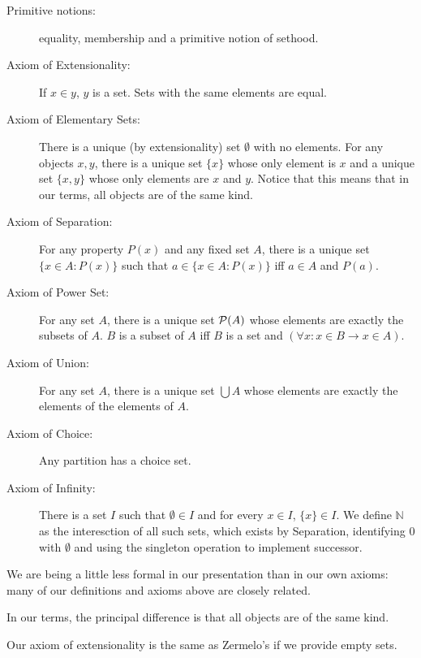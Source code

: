\documentclass[12pt]{article}
\begin{document}
\begin{description}

\item[Primitive notions:]  equality, membership and a primitive notion of sethood.  

\item[Axiom of Extensionality:]  If $x \in y$, $y$ is a set.  Sets with the same elements are equal.

\item[Axiom of Elementary Sets:]  There is a unique (by extensionality) set $\emptyset$ with no elements.  For any objects $x,y$, there is a unique set $\{x\}$ whose only element is $x$ and a unique set $\{x,y\}$ whose only elements are $x$ and $y$.  Notice that this means that in our terms, all objects are of the same kind.

\item[Axiom of Separation:]  For any property $P(x)$ and any fixed set $A$, there is a unique set
$\{x \in A:P(x)\}$ such that $a \in \{x \in A:P(x)\}$ iff $a \in A$ and $P(a)$.

\item[Axiom of Power Set:]  For any set $A$, there is a unique set ${\cal P}(A)$ whose elements are exactly the subsets of $A$.  $B$ is a subset of $A$ iff $B$ is a set and $(\forall x:x \in B \rightarrow x \in A)$.

\item[Axiom of Union:]  For any set $A$, there is a unique set $\bigcup A$ whose elements are exactly the elements of the elements of $A$.

\item[Axiom of Choice:]  Any partition has a choice set.

\item[Axiom of Infinity:]  There is a set $I$ such that $\emptyset \in I$ and for every $x \in I$, $\{x\} \in I$.  We define $\mathbb N$ as the interesction of all such sets, which exists by Separation, identifying 0 with $\emptyset$ and using the singleton operation to implement successor.



\end{description}

We are being a little less formal in our presentation than in our own axioms:  many of our definitions and axioms above are closely related.

In our terms, the principal difference is that all objects are of the same kind.  

Our axiom of extensionality is the same as Zermelo's if we provide empty sets.
\end{document}
